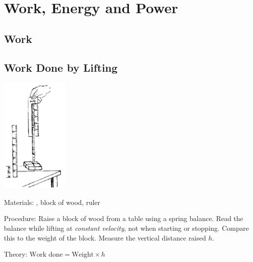 \section{Work, Energy and Power}

\begin{multicols}{2}


\section*{Work}


\subsection{Work Done by Lifting}

\begin{center}
\includegraphics[width=0.25\textwidth]{./img/source/work-lifting.png}
\end{center}

\begin{description*}
\item[Materials:]{, block of wood, ruler}
\item[Procedure:]{Raise a block of wood from a table using a spring balance. Read the balance while lifting at \emph{constant velocity}, not when starting or stopping. Compare this to the weight of the block. Measure the vertical distance raised $h$. }
\item[Theory:]{$\text{Work done} = \text{Weight} \times h$}
\end{description*}


\end{multicols}
